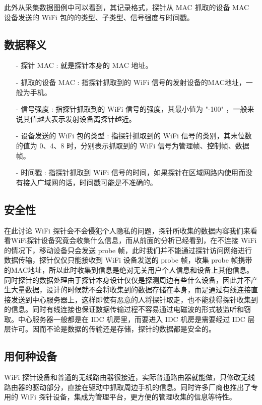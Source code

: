 此外从采集数据图例中可以看到，其记录格式，探针从 MAC 抓取的设备 MAC 设备发送的 WiFi 包的的类型、子类型、信号强度与时间戳。

\subsection{数据释义}

\begin{itemize}
\item [-] 探针 MAC : 就是探针本身的 MAC 地址。
\item [-] 抓取的设备 MAC : 指探针抓取到的 WiFi 信号的发射设备的MAC地址，一般为手机。
\item [-] 信号强度 : 指探针抓取到的 WiFi 信号的强度，其最小值为 "-100" ，一般来说其值越大表示发射设备离探针越近。
\item [-] 设备发送的 WiFi 包的类型 : 指探针抓取到的 WiFi 信号的类别，其末位数的值为 0、4、8 时，分别表示抓取到的 WiFi 信号为管理帧、控制帧、数据帧。
\item [-] 时间戳 : 指探针抓取到 WiFi 信号的时间，如果探针在区域网路内使用而没有接入广域网的话，时间戳可能是不准确的。
\end{itemize}

\subsection{安全性}

在此讨论 WiFi 探针会不会侵犯个人隐私的问题，探针所收集的数据内容我们来看看WiFi探针设备究竟会收集什么信息，而从前面的分析已经看到，在不连接 WiFi 的情况下，移动设备只会发送 probe 帧，此时我们并不能通过探针访问网络进行数据传输，探针仅仅只能接收到 WiFi 设备发送的 probe 帧，收集 probe 帧携带的MAC地址，所以此时收集到信息是绝对无关用户个人信息和设备上其他信息。同时探针的数据处理由于探针本身设计仅仅是探测周边有些什么设备，因此并不产生大量数据，设计的时候就不会将收集到的数据存储在本身，而是通过有线连接直接发送到中心服务器上，这样即使有恶意的人将探针取走，也不能获得探针收集到的信息。同时有线连接也保证数据传输过程不容易通过电磁波的形式被监听和窃取。中心服务器一般都是在 IDC 机房里，而要进入 IDC 机房是需要经过 IDC 层层许可。因而不论是数据的传输还是存储，探针的数据都是安全的。

\subsection{用何种设备}

WiFi 探针设备和普通的无线路由器很接近，实际普通路由器就能做，只修改无线路由器的驱动部分，直接在驱动中抓取周边手机的信息。同时许多厂商也推出了专用的 WiFi 探针设备，集成为管理平台，更方便的管理收集的信息等特性。

